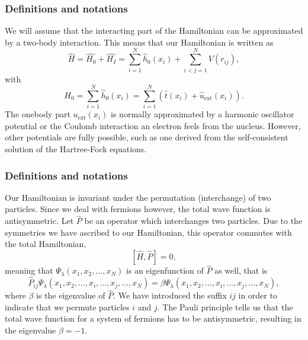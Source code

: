 \frame
{
  \frametitle{Definitions and notations}
\begin{small}
{\scriptsize
We will assume that the interacting part of the Hamiltonian
can be approximated by a two-body interaction.
This means that our Hamiltonian is written as 
\begin{equation}
    \hat{H} = \hat{H_0} + \hat{H_I} 
    = \sum_{i=1}^N \hat{h}_0(x_i) + \sum_{i<j=1}^N V(r_{ij}),
\label{Hnuclei}
\end{equation}
with 
\begin{equation}
  H_0=\sum_{i=1}^N \hat{h}_0(x_i) =  \sum_{i=1}^N\left(\hat{t}(x_i) + \hat{u}_{\mathrm{ext}}(x_i)\right).
\label{hinuclei}
\end{equation}
The onebody part $u_{\mathrm{ext}}(x_i)$ is normally approximated by a harmonic oscillator potential or the Coulomb interaction an electron feels from the nucleus. However, other potentials are fully possible, such as 
one derived from the self-consistent solution of the Hartree-Fock equations.
}
\end{small}
}

\frame
{
  \frametitle{Definitions and notations}
\begin{small}
{\scriptsize
Our Hamiltonian is invariant under the permutation (interchange) of two particles. %
Since we deal with fermions however, the total wave function is antisymmetric.
Let $\hat{P}$ be an operator which interchanges two particles.
Due to the symmetries we have ascribed to our Hamiltonian, this operator commutes with the total Hamiltonian,
\[
[\hat{H},\hat{P}] = 0,
\]
meaning that $\Psi_{\lambda}(x_1, x_2, \dots , x_N)$ is an eigenfunction of 
$\hat{P}$ as well, that is
\[
\hat{P}_{ij}\Psi_{\lambda}(x_1, x_2, \dots,x_i,\dots,x_j,\dots,x_N)=
\beta\Psi_{\lambda}(x_1, x_2, \dots,x_i,\dots,x_j,\dots,x_N),
\]
where $\beta$ is the eigenvalue of $\hat{P}$. We have introduced the suffix $ij$ in order to indicate that we permute particles $i$ and $j$.
The Pauli principle tells us that the total wave function for a system of fermions
has to be antisymmetric, resulting in the eigenvalue $\beta = -1$.   
}
\end{small}
}

